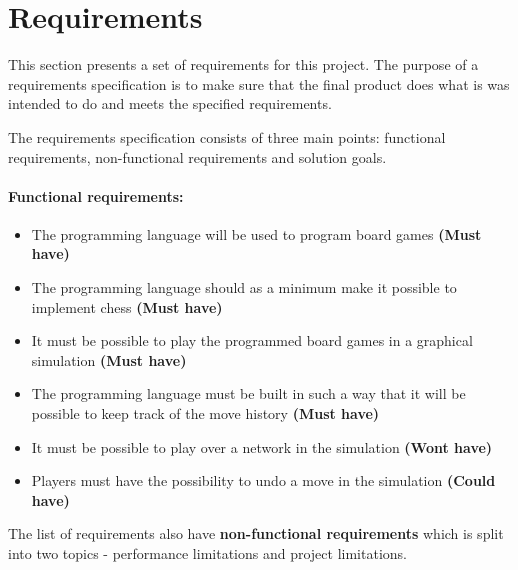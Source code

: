 \section{Requirements}

This section presents a set of requirements for this project. The purpose of a requirements specification is to make sure that the final product does what is was intended to do and meets the specified requirements. 

The requirements specification consists of three main points: functional requirements, non-functional requirements and solution goals. 


\paragraph*{Functional requirements:}
\begin{itemize}[noitemsep]
\item The programming language will be used to program board games \textbf{(Must have)}
\item The programming language should as a minimum make it possible to implement chess \textbf{(Must have)}
\item It must be possible to play the programmed board games in a graphical simulation \textbf{(Must have)}
\item The programming language must be built in such a way that it will be possible to keep track of the move history \textbf{(Must have)}
\item It must be possible to play over a network in the simulation \textbf{(Wont have)}
\item Players must have the possibility to undo a move in the simulation \textbf{(Could have)}
\end{itemize}

The list of requirements also have \textbf{non-functional requirements} which is split into two topics - performance limitations and project limitations.

